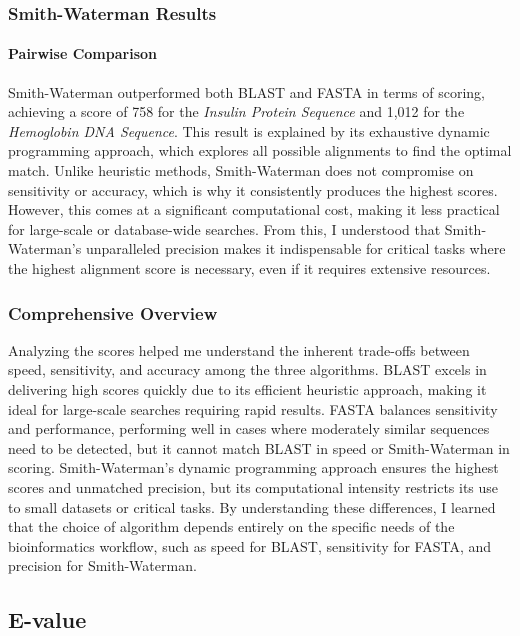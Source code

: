\documentclass{article}
\begin{document}
\subsubsection{ Smith-Waterman Results}

\paragraph{Pairwise Comparison}
Smith-Waterman outperformed both BLAST and FASTA in terms of scoring, achieving a score of 758 for the \textit{Insulin Protein Sequence} and 1,012 for the \textit{Hemoglobin DNA Sequence}. This result is explained by its exhaustive dynamic programming approach, which explores all possible alignments to find the optimal match. Unlike heuristic methods, Smith-Waterman does not compromise on sensitivity or accuracy, which is why it consistently produces the highest scores. However, this comes at a significant computational cost, making it less practical for large-scale or database-wide searches. From this, I understood that Smith-Waterman’s unparalleled precision makes it indispensable for critical tasks where the highest alignment score is necessary, even if it requires extensive resources.

\subsubsection{Comprehensive Overview}
Analyzing the scores helped me understand the inherent trade-offs between speed, sensitivity, and accuracy among the three algorithms. BLAST excels in delivering high scores quickly due to its efficient heuristic approach, making it ideal for large-scale searches requiring rapid results. FASTA balances sensitivity and performance, performing well in cases where moderately similar sequences need to be detected, but it cannot match BLAST in speed or Smith-Waterman in scoring. Smith-Waterman’s dynamic programming approach ensures the highest scores and unmatched precision, but its computational intensity restricts its use to small datasets or critical tasks. By understanding these differences, I learned that the choice of algorithm depends entirely on the specific needs of the bioinformatics workflow, such as speed for BLAST, sensitivity for FASTA, and precision for Smith-Waterman.

\subsection{E-value}
\end{document}
